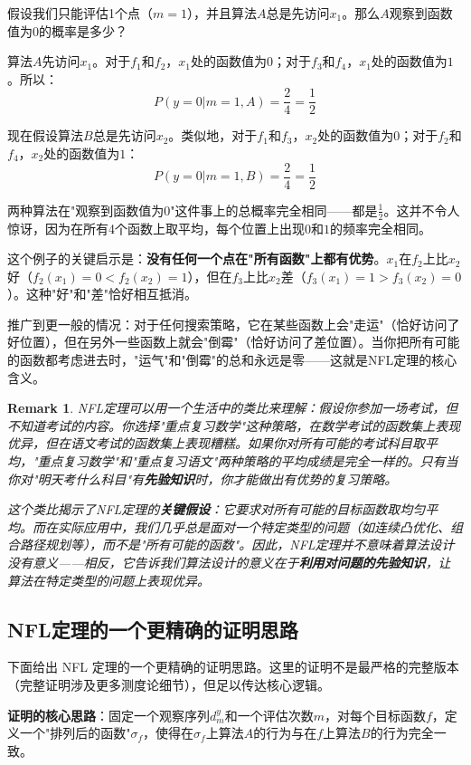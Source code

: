 \documentclass[lang=cn,zihao=-4,a4paper,fontset=windows]{beautybook}
\newtheorem*{remark}{\textbf{Remark}}
\begin{document}
假设我们只能评估1个点（$m=1$），并且算法$A$总是先访问$x_1$。那么$A$观察到函数值为$0$的概率是多少？

算法$A$先访问$x_1$。对于$f_1$和$f_2$，$x_1$处的函数值为$0$；对于$f_3$和$f_4$，$x_1$处的函数值为$1$。所以：
\[
P(y=0 | m=1, A) = \frac{2}{4} = \frac{1}{2}
\]

现在假设算法$B$总是先访问$x_2$。类似地，对于$f_1$和$f_3$，$x_2$处的函数值为$0$；对于$f_2$和$f_4$，$x_2$处的函数值为$1$：
\[
P(y=0 | m=1, B) = \frac{2}{4} = \frac{1}{2}
\]

两种算法在"观察到函数值为$0$"这件事上的总概率完全相同——都是$\frac{1}{2}$。这并不令人惊讶，因为在所有4个函数上取平均，每个位置上出现$0$和$1$的频率完全相同。

这个例子的关键启示是：\textbf{没有任何一个点在"所有函数"上都有优势}。$x_1$在$f_2$上比$x_2$好（$f_2(x_1)=0 < f_2(x_2)=1$），但在$f_3$上比$x_2$差（$f_3(x_1)=1 > f_3(x_2)=0$）。这种"好"和"差"恰好相互抵消。

推广到更一般的情况：对于任何搜索策略，它在某些函数上会"走运"（恰好访问了好位置），但在另外一些函数上就会"倒霉"（恰好访问了差位置）。当你把所有可能的函数都考虑进去时，"运气"和"倒霉"的总和永远是零——这就是NFL定理的核心含义。

\begin{remark}
NFL定理可以用一个生活中的类比来理解：假设你参加一场考试，但不知道考试的内容。你选择"重点复习数学"这种策略，在数学考试的函数集上表现优异，但在语文考试的函数集上表现糟糕。如果你对所有可能的考试科目取平均，"重点复习数学"和"重点复习语文"两种策略的平均成绩是完全一样的。只有当你对"明天考什么科目"有\textbf{先验知识}时，你才能做出有优势的复习策略。

这个类比揭示了NFL定理的\textbf{关键假设}：它要求对所有可能的目标函数取均匀平均。而在实际应用中，我们几乎总是面对一个特定类型的问题（如连续凸优化、组合路径规划等），而不是"所有可能的函数"。因此，NFL定理并不意味着算法设计没有意义——相反，它告诉我们算法设计的意义在于\textbf{利用对问题的先验知识}，让算法在特定类型的问题上表现优异。
\end{remark}

\subsection{NFL定理的一个更精确的证明思路}

下面给出 NFL 定理的一个更精确的证明思路。这里的证明不是最严格的完整版本（完整证明涉及更多测度论细节），但足以传达核心逻辑。

\textbf{证明的核心思路}：固定一个观察序列$d_m^y$和一个评估次数$m$，对每个目标函数$f$，定义一个"排列后的函数"$\sigma_f$，使得在$\sigma_f$上算法$A$的行为与在$f$上算法$B$的行为完全一致。
\end{document}
